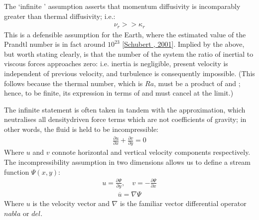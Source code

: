 \documentclass[letterpaper,10pt,english]{jupyterBook}
\begin{document}
\sphinxAtStartPar
The ‘infinite ’ assumption asserts that momentum diffusivity is incomparably greater than thermal diffusivity; i.e.:
\begin{equation*}
\begin{split} \nu_r >> \kappa_r \end{split}
\end{equation*}
\sphinxAtStartPar
This is a defensible assumption for the Earth, where the estimated value of the Prandtl number is in fact around \(10^{23}\) {[}\hyperlink{cite.references:id663}{Schubert , 2001}{]}. Implied by the above, but worth stating clearly, is that the  number of the system \sphinxhyphen{} the ratio of inertial to viscous forces \sphinxhyphen{} approaches zero: i.e. inertia is negligible, present velocity is independent of previous velocity, and turbulence is consequently impossible. (This follows because the thermal  number, which is \(Ra\), must be a product of  and ; hence, to be finite, its expression in terms of  and  must cancel at the limit.)

\sphinxAtStartPar
The infinite  statement is often taken in tandem with the  approximation, which neutralises all density\sphinxhyphen{}driven force terms which are not coefficients of gravity; in other words, the fluid is held to be incompressible:
\begin{equation*}
\begin{split} \frac{\partial u}{\partial x} + \frac{\partial v}{\partial y} = 0 \end{split}
\end{equation*}
\sphinxAtStartPar
Where \(u\) and \(v\) connote horizontal and vertical velocity components respectively. The incompressibility assumption in two dimensions allows us to define a stream function \(\Psi(x, y)\):
\begin{equation*}
\begin{split} u = \frac{\partial \Psi}{\partial y}, \quad v = -\frac{\partial \Psi}{\partial x} \end{split}
\end{equation*}\begin{equation*}
\begin{split} \overline{u} = \nabla \Psi \end{split}
\end{equation*}
\sphinxAtStartPar
Where \(u\) is the velocity vector and \(\nabla\) is the familiar vector differential operator \(nabla\) or \(del\).
\end{document}
